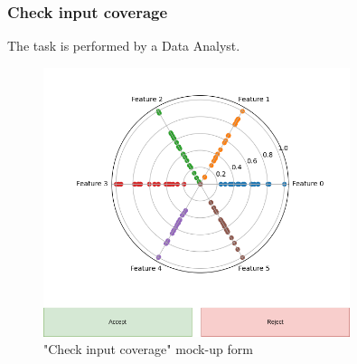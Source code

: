 \subsubsection{Check input coverage}

The task is performed by a Data Analyst.

\begin{figure}[H]
\centering
\includegraphics[width=0.8\textwidth]{figures/check_input_coverage.png}
\caption{"Check input coverage" mock-up form}
\end{figure}

